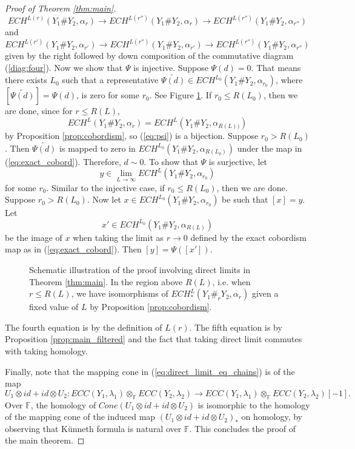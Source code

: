 \documentclass{article}
\numberwithin{equation}{section}
\theoremstyle{definition}
\newcommand{\F}{\mathbb{F}}
\begin{document}
\begin{proof}[Proof of Theorem \ref{thm:main}]
\begin{equation}
    ECH^{L(r)}(Y_1 \# Y_2, \alpha_r) \longrightarrow ECH^{L(r'')}(Y_1 \# Y_2, \alpha_r) \longrightarrow ECH^{L(r'')}(Y_1 \# Y_2, \alpha_{r''})
\end{equation}
and
\begin{equation}
    ECH^{L(r')}(Y_1 \# Y_2, \alpha_{r'}) \longrightarrow ECH^{L(r'')}(Y_1 \# Y_2, \alpha_{r'}) \longrightarrow ECH^{L(r'')}(Y_1 \# Y_2, \alpha_{r''})
\end{equation}
given by the right followed by down composition of the commutative diagram (\ref{diag:four}). Now we show that $\Psi$ is injective. Suppose $\Psi(d) = 0$. That means there exists $L_0$ such that a representative $\widetilde{\Psi(d)} \in ECH^{L_0}(Y_1 \# Y_2, \alpha_{r_0})$, where $[\widetilde{\Psi(d)}]=\Psi(d)$, is zero for some $r_0$. See Figure \ref{fig:direct_limit}. If $r_0\leq R(L_0)$, then we are done, since for $r\leq R(L)$, 
$$ECH^{L}(Y_1 \# Y_2, \alpha_r) =  ECH^{L}(Y_1 \# Y_2, \alpha_{R(L))})$$ by Proposition \ref{prop:cobordism}, so (\ref{eq:psi}) is a bijection. Suppose $r_0 > R(L_0)$. Then $\widetilde{\Psi(d)}$ is mapped to zero in $ECH^{L_0}(Y_1 \# Y_2, \alpha_{R(L_0)})$ under the map in (\ref{eq:exact_cobord}). Therefore, $d\sim 0$. To show that $\Psi$ is surjective, let 
$$y\in \lim\limits_{L \to \infty} ECH^L(Y_1 \# Y_2, \alpha_{r_0})$$ 
for some $r_0$. Similar to the injective case, if $r_0\leq R(L_0)$, then we are done. Suppose $r_0 > R(L_0)$. Now let $x\in ECH^{L_0}(Y_1 \# Y_2, \alpha_{r_0})$ be such that $[x]=y$. Let 
$$x'\in ECH^{L_0}(Y_1 \# Y_2, \alpha_{R(L)})$$ 
be the image of $x$ when taking the limit as $r\to 0$ defined by the exact cobordism map as in (\ref{eq:exact_cobord}). Then $[y] = \Psi([x'])$.


\begin{figure}
    \centering
%    
    
    \caption{Schematic illustration of the proof involving direct limits in Theorem \ref{thm:main}. In the region above $R(L)$, i.e. when $r\leq R(L)$, we have isomorphisms of $ECH_*^{L}(Y_1\#_{r} Y_2, \alpha_{r})$ given a fixed value of $L$ by Proposition \ref{prop:cobordism}.}
    \label{fig:direct_limit}
\end{figure}

The fourth equation is by the definition of $L(r)$. The fifth equation is by Proposition \ref{prop:main_filtered} and the fact that taking direct limit commutes with taking homology. 

Finally, note that the mapping cone in (\ref{eq:direct_limit_eq_chains}) is of the map 
$$U_1 \otimes id + id \otimes U_2 : ECC(Y_1, \lambda_1) \otimes_{\F} ECC(Y_2, \lambda_2) \longrightarrow  ECC(Y_1, \lambda_1) \otimes_{\F} ECC(Y_2, \lambda_2)[-1].$$ 
Over $\F$, the homology of $Cone(U_1 \otimes id + id \otimes U_2)$ is isomorphic to the homology of the mapping cone of the induced map $(U_1 \otimes id + id \otimes U_2)_*$ on homology, by observing that K\"{u}nneth formula is natural over $\F$. This concludes the proof of the main theorem.
\end{proof}

\printbibliography
\end{document}
